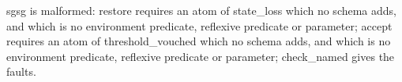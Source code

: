 sgsg
is malformed:
restore
requires an atom of
state_loss
which no schema adds, and which is no environment predicate, reflexive predicate or parameter;
accept
requires an atom of
threshold_vouched
which no schema adds, and which is no environment predicate, reflexive predicate or parameter;
check_named gives the faults.
